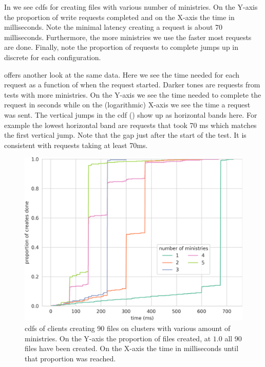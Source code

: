 In  we see \acp{cdf} for creating files with various number of ministries. On the Y-axis the proportion of write requests completed and on the X-axis the time in milliseconds. Note the minimal latency creating a request is about 70 milliseconds. Furthermore, the more ministries we use the faster most requests are done. Finally, note the proportion of requests to complete jumps up in discrete for each configuration.

 offers another look at the same data. Here we see the time needed for each request as a function of when the request started. Darker tones are requests from tests with more ministries. On the Y-axis we see the time needed to complete the request in seconds while on the (logarithmic) X-axis we see the time a request was sent. The vertical jumps in the \ac{cdf} () show up as horizontal bands here. For example the lowest horizontal band are requests that took 70 ms which matches the first vertical jump. Note that the gap just after the start of the test. It is consistent with requests taking at least 70ms.

\begin{figure}[htbp]
	\centering
	\includegraphics[height=\textheight]{../results/plots/touch.png}
	\caption{\acp{cdf} of clients creating 90 files on clusters with various amount of ministries. On the Y-axis the proportion of files created, at $1.0$ all 90 files have been created. On the X-axis the time in milliseconds until that proportion was reached.}
	\label{fig:touch}
\end{figure}

